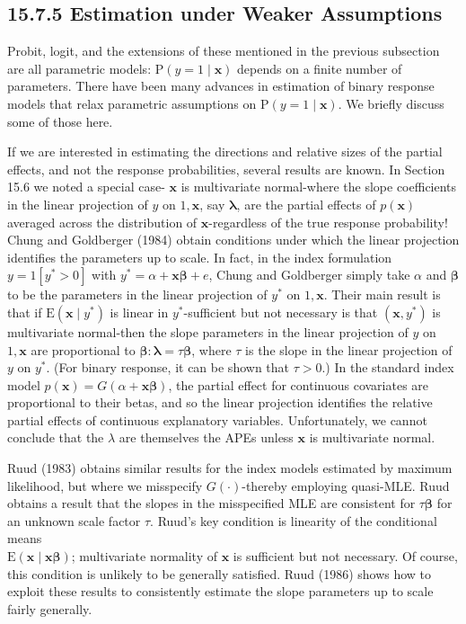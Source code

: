 \documentclass[10pt]{article}
\begin{document}
\subsection*{15.7.5 Estimation under Weaker Assumptions}
Probit, logit, and the extensions of these mentioned in the previous subsection are all parametric models: $\mathrm{P}(y=1 \mid \mathbf{x})$ depends on a finite number of parameters. There have been many advances in estimation of binary response models that relax parametric assumptions on $\mathrm{P}(y=1 \mid \mathbf{x})$. We briefly discuss some of those here.

If we are interested in estimating the directions and relative sizes of the partial effects, and not the response probabilities, several results are known. In Section 15.6 we noted a special case- $\mathbf{x}$ is multivariate normal-where the slope coefficients in the linear projection of $y$ on $1, \mathbf{x}$, say $\boldsymbol{\lambda}$, are the partial effects of $p(\mathbf{x})$ averaged across the distribution of $\mathbf{x}$-regardless of the true response probability! Chung and Goldberger (1984) obtain conditions under which the linear projection identifies the parameters up to scale. In fact, in the index formulation $y=1\left[y^{*}>0\right]$ with $y^{*}=\alpha+\mathbf{x} \boldsymbol{\beta}+e$, Chung and Goldberger simply take $\alpha$ and $\boldsymbol{\beta}$ to be the parameters in the linear projection of $y^{*}$ on $1, \mathbf{x}$. Their main result is that if $\mathrm{E}\left(\mathbf{x} \mid y^{*}\right)$ is linear in $y^{*}$-sufficient but not necessary is that $\left(\mathbf{x}, y^{*}\right)$ is multivariate normal-then the slope parameters in the linear projection of $y$ on $1, \mathbf{x}$ are proportional to $\boldsymbol{\beta}: \boldsymbol{\lambda}=\tau \boldsymbol{\beta}$, where $\tau$ is the slope in the linear projection of $y$ on $y^{*}$. (For binary response, it can be shown that $\tau>0$.) In the standard index model $p(\mathbf{x})=G(\alpha+\mathbf{x} \boldsymbol{\beta})$, the partial effect for continuous covariates are proportional to their betas, and so the linear projection identifies the relative partial effects of continuous explanatory variables. Unfortunately, we cannot conclude that the $\lambda$ are themselves the APEs unless $\mathbf{x}$ is multivariate normal.

Ruud (1983) obtains similar results for the index models estimated by maximum likelihood, but where we misspecify $G(\cdot)$-thereby employing quasi-MLE. Ruud obtains a result that the slopes in the misspecified MLE are consistent for $\tau \boldsymbol{\beta}$ for an unknown scale factor $\tau$. Ruud's key condition is linearity of the conditional means\\
$\mathrm{E}(\mathbf{x} \mid \mathbf{x} \boldsymbol{\beta})$; multivariate normality of $\mathbf{x}$ is sufficient but not necessary. Of course, this condition is unlikely to be generally satisfied. Ruud (1986) shows how to exploit these results to consistently estimate the slope parameters up to scale fairly generally.
\end{document}
